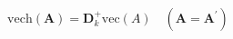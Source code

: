 \begin{equation}
	\mathrm{vech}
	\left(
	\mathbf{A}
	\right)
	=
	\mathbf{D}_{k}^{+}
	\mathrm{vec}
	\left(
	A
	\right)
	\quad
	\left(
	\mathbf{A}
	=
	\mathbf{A}^{\prime}
	\right)
	\label{eq:linearAlgebra-vech-and-pinv-of-dcap}
\end{equation}
